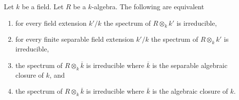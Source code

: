 \begin{lemma}
\label{editorial-source-lemma-geometrically-irreducible}
Let $k$ be a field.
Let $R$ be a $k$-algebra.
The following are equivalent
\begin{enumerate}
\item for every field extension $k'/k$ the
spectrum of $R \otimes_k k'$ is irreducible,
\item for every finite separable field extension $k'/k$ the
spectrum of $R \otimes_k k'$ is irreducible,
\item the spectrum of $R \otimes_k \overline{k}$ is irreducible
where $\overline{k}$ is the separable algebraic closure of $k$, and
\item the spectrum of $R \otimes_k \overline{k}$ is irreducible
where $\overline{k}$ is the algebraic closure of $k$.
\end{enumerate}
\end{lemma}


